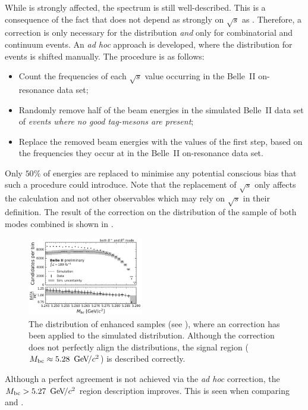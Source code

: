 While \Mbc is strongly affected, the \EB spectrum is still well-described.
This is a consequence of the fact that \EB does not depend as strongly on $\sqrt{s}$ as \Mbc.
Therefore, a correction is only necessary for the \Mbc distribution \textit{and} only for combinatorial \BB and continuum events.
An \textit{ad hoc} approach is developed, where the \Mbc distribution for \MC events is shifted manually. 
The procedure is as follows:
\begin{itemize}
    \item Count the frequencies of each $\sqrt{s}$ value occurring in the Belle~II on-resonance data set;
    \item Randomly remove half of the beam energies in the simulated Belle~II data set of \textit{events where no good tag-\B mesons are present};
    \item Replace the removed beam energies with the values of the first step, based on the frequencies they occur at in the Belle~II on-resonance data set.
\end{itemize}
Only $50\%$ of energies are replaced to minimise any potential conscious bias that such a procedure could introduce.
Note that the replacement of $\sqrt{s}$ only affects the \Mbc calculation and not other observables which may rely on $\sqrt{s}$ in their definition.
The result of the correction on the \Mbc distribution of the sample of both \FEI modes combined is shown in .
\begin{figure}[hbtp!]
    \centering
    \includegraphics[width=0.45\textwidth]{figures/data_validation/Bboth_qqbar_enhanced_mbccorrected.pdf}
    \caption{\label{fig:qqbar_enhanced_mbccorrected} The \Mbc distribution of \qqbar enhanced samples (see ),
    where an \Mbc correction has been applied to the simulated distribution.
    Although the correction does not perfectly align the distributions, the signal region (${M_{\mathrm{bc}}}\approx5.28~{\mathrm{\,Ge\kern -0.1em V\!/}c^2}$) is described correctly.}
\end{figure}
Although a perfect agreement is not achieved via the \textit{ad hoc} correction, the ${M_{\mathrm{bc}}}>5.27~{\mathrm{\,Ge\kern -0.1em V\!/}c^2}$ region description improves. 
This is seen when comparing  and .

